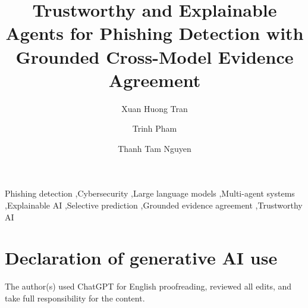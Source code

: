 \documentclass[final,5p,times,twocolumn]{elsarticle}
\begin{document}

\begin{frontmatter}

\title{Trustworthy and Explainable Agents for Phishing Detection with
Grounded Cross-Model Evidence Agreement}

\author[hust]{Xuan Huong Tran}


\author[griffith]{Trinh Pham}

\author[griffith]{Thanh Tam Nguyen}







\begin{abstract}

\end{abstract}

\begin{keyword}
Phishing detection \sep Cybersecurity \sep Large language models \sep Multi-agent systems
\sep Explainable AI \sep Selective prediction \sep Grounded evidence agreement
\sep Trustworthy AI
\end{keyword}

\end{frontmatter}









\section*{Declaration of generative AI use}
\label{sec:disclosure}

The author(s) used ChatGPT for English proofreading, reviewed all edits, and take full responsibility for the content.



\end{document}
